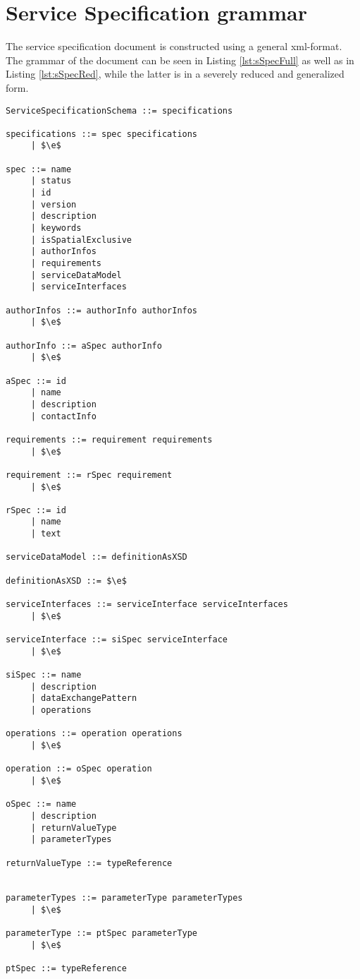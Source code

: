 \section{Service Specification grammar}
The service specification document is constructed using a general xml-format. The grammar of the document can be seen in Listing \ref{lst:sSpecFull} as well as in Listing \ref{lst:sSpecRed}, while the latter is in a severely reduced and generalized form.
\begin{lstlisting}[keywordstyle={},label={lst:sSpecFull},caption={Full parser grammar of Service Specification Schema}]
ServiceSpecificationSchema ::= specifications

specifications ::= spec specifications
     | $\e$
     
spec ::= name
     | status
     | id
     | version
     | description
     | keywords
     | isSpatialExclusive
     | authorInfos
     | requirements
     | serviceDataModel
     | serviceInterfaces
     
authorInfos ::= authorInfo authorInfos
     | $\e$

authorInfo ::= aSpec authorInfo
     | $\e$

aSpec ::= id
     | name
     | description
     | contactInfo

requirements ::= requirement requirements
     | $\e$

requirement ::= rSpec requirement
     | $\e$

rSpec ::= id
     | name
     | text

serviceDataModel ::= definitionAsXSD

definitionAsXSD ::= $\e$

serviceInterfaces ::= serviceInterface serviceInterfaces
     | $\e$

serviceInterface ::= siSpec serviceInterface
     | $\e$

siSpec ::= name
     | description
     | dataExchangePattern
     | operations

operations ::= operation operations
     | $\e$

operation ::= oSpec operation
     | $\e$

oSpec ::= name
     | description
     | returnValueType
     | parameterTypes

returnValueType ::= typeReference


parameterTypes ::= parameterType parameterTypes
     | $\e$

parameterType ::= ptSpec parameterType
     | $\e$

ptSpec ::= typeReference
\end{lstlisting}

